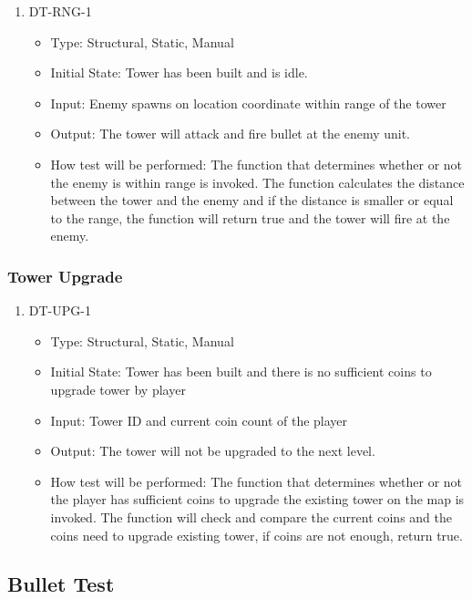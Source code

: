 \documentclass[12,english]{article}
\begin{document}
\begin{enumerate}
    \item DT-RNG-1
    \begin{itemize}
        \item Type: Structural, Static, Manual
        \item Initial State: Tower has been built and is idle.
        \item Input: Enemy spawns on location coordinate within range of the tower
        \item Output: The tower will attack and fire bullet at the enemy unit.
        \item How test will be performed: The function that determines whether or not the enemy is within range is invoked. The function calculates the distance between the tower and the enemy and if the distance is smaller or equal to the range, the function will return true and the tower will fire at the enemy. 
    \end{itemize}
\end{enumerate}

\subsubsection{Tower Upgrade}
\begin{enumerate}
    \item DT-UPG-1
    \begin{itemize}
        \item Type: Structural, Static, Manual
        \item Initial State: Tower has been built and there is no sufficient coins to upgrade tower by player
        \item Input: Tower ID and current coin count of the player
        \item Output: The tower will not be upgraded to the next level.
        \item How test will be performed: The function that determines whether or not the player has sufficient coins to upgrade the existing tower on the map is invoked. The function will check and compare the current coins and the coins need to upgrade existing tower, if coins are not enough, return true.
    \end{itemize}
\end{enumerate}

\subsection{Bullet Test}
\end{document}
